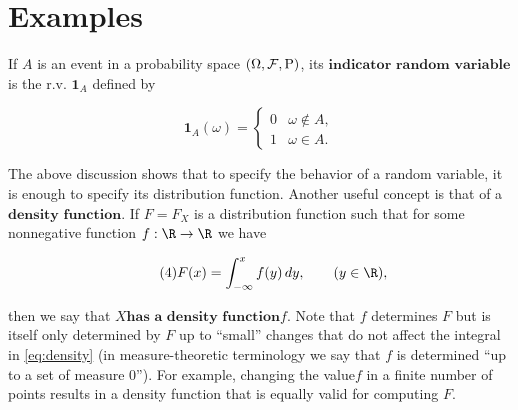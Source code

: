 \section{Examples}

\begin{example}
If $A$ is an event in a probability space
$(\Omega, {\cal F}, \mathrm{P})$, its
$\textbf{indicator random variable}$ is the r.v.
$\mathbf{1}_A$ defined by

\[
\mathbf{1}_A(\omega) = \begin{cases} 0 & \omega \notin A, \\ 1 & \omega \in A. \end{cases}
\]

\noindent The above discussion shows that to specify the
behavior of a random variable, it is enough to specify
its distribution function. Another useful concept is
that of a $\textbf{density function}$. If $F=F_X$ is
a distribution function such that for some nonnegative
function $f:\R\to\R$ we have

\begin{equation*} \tag{4}\label{eq:density}
F(x) = \int_{-\infty}^x f(y)\,dy, \qquad (y\in\R),
\end{equation*}

\noindent then we say that $\textbf{$X$has a density function$f
$}$. Note that $f$ determines $F$ but is itself only
determined by $F$ up to ``small'' changes that do not
affect the integral in \eqref{eq:density} (in
measure-theoretic terminology we say that $f$ is
determined ``up to a set of measure $0$''). For
example, changing the value$f$ in a finite number of
points results in a density function that is equally
valid for computing $F$.
\end{example}


